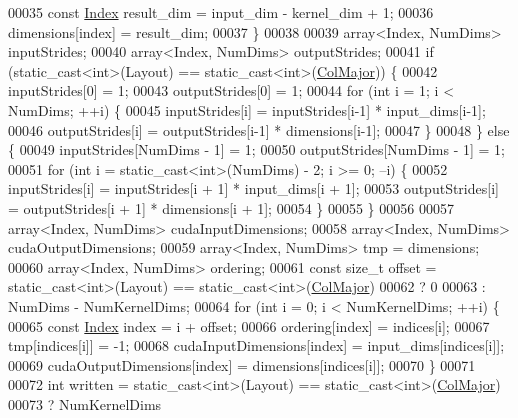 \begin{DoxyCode}
00035       \textcolor{keyword}{const} \hyperlink{namespace_eigen_a62e77e0933482dafde8fe197d9a2cfde}{Index} result\_dim = input\_dim - kernel\_dim + 1;
00036       dimensions[index] = result\_dim;
00037     \}
00038 
00039     array<Index, NumDims> inputStrides;
00040     array<Index, NumDims> outputStrides;
00041     \textcolor{keywordflow}{if} (static\_cast<int>(Layout) == static\_cast<int>(\hyperlink{group__enums_ggaacded1a18ae58b0f554751f6cdf9eb13a0cbd4bdd0abcfc0224c5fcb5e4f6669a}{ColMajor})) \{
00042       inputStrides[0] = 1;
00043       outputStrides[0] = 1;
00044       \textcolor{keywordflow}{for} (\textcolor{keywordtype}{int} i = 1; i < NumDims; ++i) \{
00045         inputStrides[i] = inputStrides[i-1] * input\_dims[i-1];
00046         outputStrides[i] = outputStrides[i-1] * dimensions[i-1];
00047       \}
00048     \} \textcolor{keywordflow}{else} \{
00049       inputStrides[NumDims - 1] = 1;
00050       outputStrides[NumDims - 1] = 1;
00051       \textcolor{keywordflow}{for} (\textcolor{keywordtype}{int} i = static\_cast<int>(NumDims) - 2; i >= 0; --i) \{
00052         inputStrides[i] = inputStrides[i + 1] * input\_dims[i + 1];
00053         outputStrides[i] = outputStrides[i + 1] * dimensions[i + 1];
00054       \}
00055     \}
00056 
00057     array<Index, NumDims> cudaInputDimensions;
00058     array<Index, NumDims> cudaOutputDimensions;
00059     array<Index, NumDims> tmp = dimensions;
00060     array<Index, NumDims> ordering;
00061     \textcolor{keyword}{const} \textcolor{keywordtype}{size\_t} offset = \textcolor{keyword}{static\_cast<}\textcolor{keywordtype}{int}\textcolor{keyword}{>}(Layout) == static\_cast<int>(\hyperlink{group__enums_ggaacded1a18ae58b0f554751f6cdf9eb13a0cbd4bdd0abcfc0224c5fcb5e4f6669a}{ColMajor})
00062                               ? 0
00063                               : NumDims - NumKernelDims;
00064     \textcolor{keywordflow}{for} (\textcolor{keywordtype}{int} i = 0; i < NumKernelDims; ++i) \{
00065       \textcolor{keyword}{const} \hyperlink{namespace_eigen_a62e77e0933482dafde8fe197d9a2cfde}{Index} index = i + offset;
00066       ordering[index] = indices[i];
00067       tmp[indices[i]] = -1;
00068       cudaInputDimensions[index] = input\_dims[indices[i]];
00069       cudaOutputDimensions[index] = dimensions[indices[i]];
00070     \}
00071 
00072     \textcolor{keywordtype}{int} written = \textcolor{keyword}{static\_cast<}\textcolor{keywordtype}{int}\textcolor{keyword}{>}(Layout) == static\_cast<int>(\hyperlink{group__enums_ggaacded1a18ae58b0f554751f6cdf9eb13a0cbd4bdd0abcfc0224c5fcb5e4f6669a}{ColMajor})
00073                       ? NumKernelDims

\end{DoxyCode}
